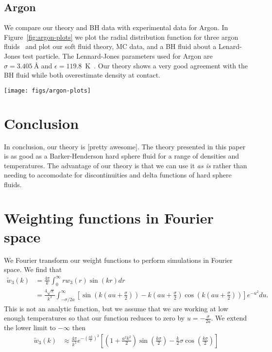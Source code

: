 \documentclass[letterpaper,twocolumn,amsmath,amssymb,prb]{revtex4-1}
\newcommand{\red}[1]{{\color{red} #1}}
\newcommand{\fixme}[1]{\red{[#1]}}
\begin{document}
\subsection{Argon}

We compare our theory and BH data with experimental data for Argon. In
Figure~\ref{fig:argon-plots} we plot the radial distribution function
for three argon fluids~\cite{mikolaj2004structure,
  eggert2002quantitative, yarnell1973structure} and plot our soft
fluid theory, MC data, and a BH fluid about a Lenard-Jones test
particle. The Lennard-Jones parameters used for Argon are $\sigma = 3.405
~\textrm{\AA}$ and $\epsilon = 119.8$~K~\cite{verlet1967computer}. Our
theory shows a very good agreement with the BH fluid while both
overestimate density at contact.
\begin{figure*}
  \begin{center}
    \texttt{[image: figs/argon-plots]}
  \end{center}
  \caption{Radial distribution functions of Argon.}
  \label{fig:argon-plots}
\end{figure*}

\section{Conclusion}

In conclusion, our theory is \fixme{pretty awesome}. The theory
presented in this paper is as good as a Barker-Henderson hard sphere
fluid for a range of densities and temperatures. The advantage of our
theory is that we can use it \emph{as is} rather than needing to
accomodate for discontinuities and delta functions of hard sphere
fluids.

\appendix

\section{Weighting functions in Fourier space}\label{sec:fourier}

We Fourier transform our weight functions to perform simulations in
Fourier space.  We find that
\begin{align}
  \tilde{w}_3(k) &= \frac{4\pi}{k} \int_0^\infty r w_3(r) \sin(kr) dr \\ 
  &= \frac{4\sqrt{\pi}}{k^3}\int_{-\sigma/2a}^\infty \left[
    \sin(k(au+\frac{\sigma}{2})) - k(au + \frac{\sigma}{2})
    \cos(k(au+\frac{\sigma}{2}))\right] e^{-u^2} du.
\end{align}
This is not an analytic function, but we assume that we are working at
low enough temperatures so that our function reduces to zero by $u=
-\frac{\sigma}{2a}$. We extend the lower limit to $-\infty$ then
\begin{align}
  \tilde{w}_3(k) &\approx
  \frac{4\pi}{k^3}e^{-\left(\frac{ak}{2}\right)^2}\left[ \left(1 +
    \frac{a^2k^2}{2} \right) \sin\left(\frac{k\sigma}{2}\right) -
    \frac{k}{2} \sigma\cos\left(\frac{k \sigma}{2}\right) \right]
\end{align}
\end{document}
